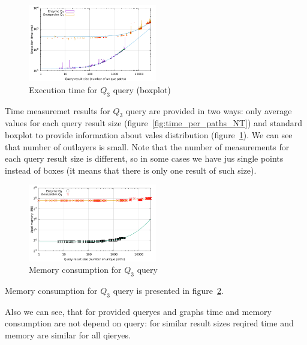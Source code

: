 \begin{figure}[h]
  \begin{center}
    \includegraphics[width=0.5\textwidth]{data/time_per_paths_NT_boxplot.pdf}
    \caption{Execution time for $Q_3$ query (boxplot)}
    \label{fig:time_per_paths_NT_boxplot}
  \end{center}
\end{figure}


Time measuremet results for $Q_3$ query are provided in two ways: only average values for each query result size (figure~\ref{fig:time_per_paths_NT}) and standard boxplot to provide information about vales distribution (figure~\ref{fig:time_per_paths_NT_boxplot}). We can see that number of outlayers is small. Note that the number of measurements for each query result size is different, so in some cases we have jus single points instead of boxes (it means that there is only one result of such size).


\begin{figure}[h]
  \begin{center}
    \includegraphics[width=0.5\textwidth]{data/mem_per_paths_NT.pdf}
    \caption{Memory consumption for $Q_3$ query}
    \label{fig:mem_per_paths_NT}
  \end{center}
\end{figure}

Memory consumption for $Q_3$ query is presented in figure~\ref{fig:mem_per_paths_NT}.

Also we can see, that for provided queryes and graphs time and memory consumption are not depend on query: for similar result sizes reqired time and memory are similar for all qieryes.